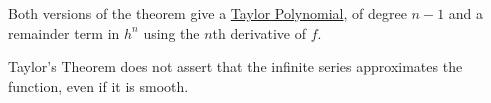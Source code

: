 \documentclass[../Main.tex]{subfiles}
\begin{document}
\begin{remarks}
    \item Both versions of the theorem give a \underline{Taylor Polynomial}, of degree $n - 1$ and a remainder term in $h^n$ using the $n$th derivative of $f$.
    \item Taylor's Theorem does not assert that the infinite series approximates the function, even if it is smooth.
\end{remarks}
\end{document}
